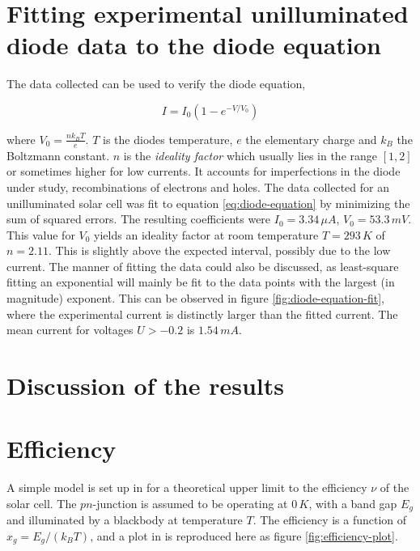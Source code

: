 \documentclass[a4paper,twoside=false,abstract=false,numbers=noenddot,
titlepage=false,headings=small,parskip=half,version=last]{scrartcl}
\begin{document}
\section{Fitting experimental unilluminated diode data to the diode equation}
The data collected can be used to verify the diode equation,

\begin{equation}
    I = I_0 \left(1-e^{-V/V_0}\right)\label{eq:diode-equation}
\end{equation}

where $V_0 = \frac{nk_BT}{e}$.
$T$ is the diodes temperature, $e$ the elementary charge and $k_B$ the Boltzmann constant.
$n$ is the \emph{ideality factor} which usually lies in the range $[1,2]$ or sometimes higher for low currents.
It accounts for imperfections in the diode under study, recombinations of electrons and holes.
The data collected for an unilluminated solar cell was fit to equation \eqref{eq:diode-equation} by minimizing the sum of squared errors.
The resulting coefficients were $I_0=3.34\,\mu A$, $V_0=53.3\,mV$.
This value for $V_0$ yields an ideality factor at room temperature $T=293\,K$ of $n=2.11$.
This is slightly above the expected interval, possibly due to the low current.
The manner of fitting the data could also be discussed, as least-square fitting an exponential will mainly be fit to the data points with the largest (in magnitude) exponent.
This can be observed in figure \ref{fig:diode-equation-fit}, where the experimental current is distinctly larger than the fitted current.
The mean current for voltages $U>-0.2$ is $1.54\,mA$.
\section{Discussion of the results}


\section{Efficiency}
A simple model is set up in \cite{lab-instruction} for a theoretical upper limit to the efficiency $\nu$ of the solar cell.
The $pn$-junction is assumed to be operating at $0\,K$, with a band gap $E_g$
and illuminated by a blackbody at temperature $T$.
The efficiency is a function of $x_g=E_g/(k_BT)$, and a plot in \cite{lab-instruction} is reproduced here as figure \ref{fig:efficiency-plot}.
\end{document}
